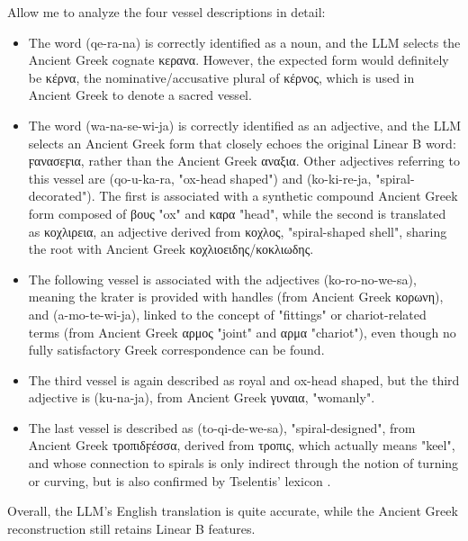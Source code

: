 Allow me to analyze the four vessel descriptions in detail:
\begin{itemize}
\item The word \textlinb{\Bqe\Bra\Bna} (qe-ra-na) is correctly identified as a noun, and the LLM selects the Ancient Greek cognate \textgreek{κερανα}.
However, the expected form would definitely be \textgreek{κέρνα}, the nominative/accusative plural of \textgreek{κέρνος}, which is used in Ancient Greek to denote a sacred vessel.
\item The word \textlinb{\Bwa\Bna\Bse\Bwi\Bja} (wa-na-se-wi-ja) is correctly identified as an adjective, and the LLM selects an Ancient Greek form that closely echoes the original Linear B word: \textgreek{ϝανασεϝια}, rather than the Ancient Greek \textgreek{αναξια}.
Other adjectives referring to this vessel are \textlinb{\Bqo\Bu\Bka\Bra} (qo-u-ka-ra, "ox-head shaped") and \textlinb{\Bko\Bi\Bre\Bja} (ko-ki-re-ja, "spiral-decorated").
The first is associated with a synthetic compound Ancient Greek form composed of \textgreek{βους} "ox" and \textgreek{καρα} "head", while the second is translated as \textgreek{κοχλιρεια}, an adjective derived from \textgreek{κοχλος}, "spiral-shaped shell", sharing the root with Ancient Greek \textgreek{κοχλιοειδης/κοκλιωδης}.
\item The following vessel is associated with the adjectives \textlinb{\Bko\Bro\Bno\Bwe\Bsa} (ko-ro-no-we-sa), meaning the krater is provided with handles (from Ancient Greek \textgreek{κορωνη}), and \textlinb{\Ba\Bmo\Bte\Bwi\Bja} (a-mo-te-wi-ja), linked to the concept of "fittings" or chariot-related terms (from Ancient Greek \textgreek{αρμος} "joint" and \textgreek{αρμα} "chariot"), even though no fully satisfactory Greek correspondence can be found.
\item The third vessel is again described as royal and ox-head shaped, but the third adjective is \textlinb{\Bku\Bna\Bja} (ku-na-ja), from Ancient Greek \textgreek{γυναια}, "womanly".
\item The last vessel is described as \textlinb{\Bto\Bqi\Bde\Bwe\Bsa} (to-qi-de-we-sa), "spiral-designed", from Ancient Greek \textgreek{τροπιδϝέσσα}, derived from \textgreek{τροπις}, which actually means "keel", and whose connection to spirals is only indirect through the notion of turning or curving, but is also confirmed by Tselentis' lexicon \cite{tselentis}.
\end{itemize}
Overall, the LLM's English translation is quite accurate, while the Ancient Greek reconstruction still retains Linear B features.

